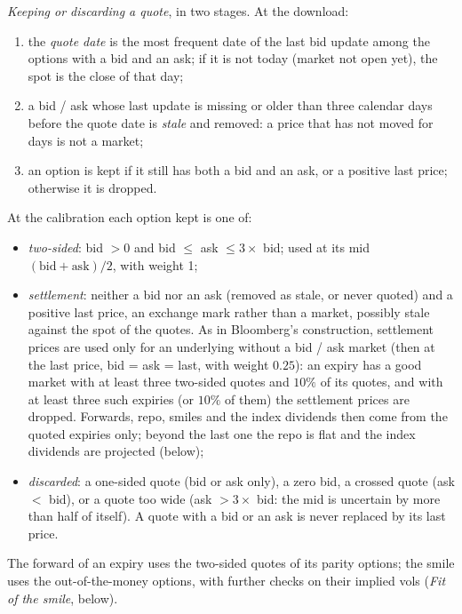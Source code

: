 \emph{Keeping or discarding a quote}, in two stages. At the download:
\begin{enumerate}[nosep]
  \item the \emph{quote date} is the most frequent date of the last bid update among the options with a bid and an
        ask; if it is not today (market not open yet), the spot is the close of that day;
  \item a bid / ask whose last update is missing or older than three calendar days before the quote date is
        \emph{stale} and removed: a price that has not moved for days is not a market;
  \item an option is kept if it still has both a bid and an ask, or a positive last price; otherwise it is dropped.
\end{enumerate}
At the calibration each option kept is one of:
\begin{itemize}[nosep]
  \item \emph{two-sided}: bid $> 0$ and bid $\le$ ask $\le 3\times$ bid; used at its mid $(\text{bid} + \text{ask})/2$,
        with weight 1;
  \item \emph{settlement}: neither a bid nor an ask (removed as stale, or never quoted) and a positive last price,
        an exchange mark rather than a market, possibly stale against the spot of the quotes. As in Bloomberg's
        construction, settlement prices are used only for an underlying without a bid / ask market (then at the last
        price, bid = ask = last, with weight $0.25$): an expiry has a good market with at least three two-sided quotes
        and $10\%$ of its quotes, and with at least three such expiries (or $10\%$ of them) the settlement prices are
        dropped. Forwards, repo, smiles and the index dividends then come from the quoted expiries only; beyond the
        last one the repo is flat and the index dividends are projected (below);
  \item \emph{discarded}: a one-sided quote (bid or ask only), a zero bid, a crossed quote (ask $<$ bid), or a quote
        too wide (ask $> 3\times$ bid: the mid is uncertain by more than half of itself). A quote with a bid or an ask
        is never replaced by its last price.
\end{itemize}
The forward of an expiry uses the two-sided quotes of its parity options; the smile uses the out-of-the-money options, with further checks on their implied vols
(\emph{Fit of the smile}, below).

